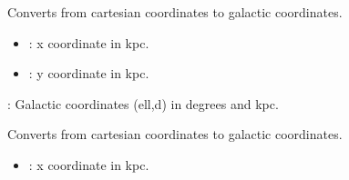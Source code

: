 \documentclass[letterpaper,10pt,english]{sphinxmanual}
\begin{document}
\begin{fulllineitems}
\begin{fulllineitems}
\begin{description}
\end{description}

\end{fulllineitems}


\begin{fulllineitems}
\label{\detokenize{ModelHelper:ModelHelper.ModelHelper.convert_cartesian_to_galactic_2D}}
\pysigstartsignatures
{}
\pysigstopsignatures
\sphinxAtStartPar
Converts from cartesian coordinates to galactic coordinates.
\begin{description}
\begin{itemize}
\item {} 
\sphinxAtStartPar
{}: x coordinate in kpc.

\item {} 
\sphinxAtStartPar
{}: y coordinate in kpc.

\end{itemize}

\sphinxAtStartPar
{}: Galactic coordinates (ell,d) in degrees and kpc.

\end{description}

\end{fulllineitems}


\begin{fulllineitems}
\label{\detokenize{ModelHelper:ModelHelper.ModelHelper.convert_cartesian_to_galactic_3D}}
\pysigstartsignatures
{}
\pysigstopsignatures
\sphinxAtStartPar
Converts from cartesian coordinates to galactic coordinates.
\begin{description}
\begin{itemize}
\item {} 
\sphinxAtStartPar
{}: x coordinate in kpc.


\end{itemize}
\end{description}
\end{fulllineitems}
\end{fulllineitems}
\end{document}

